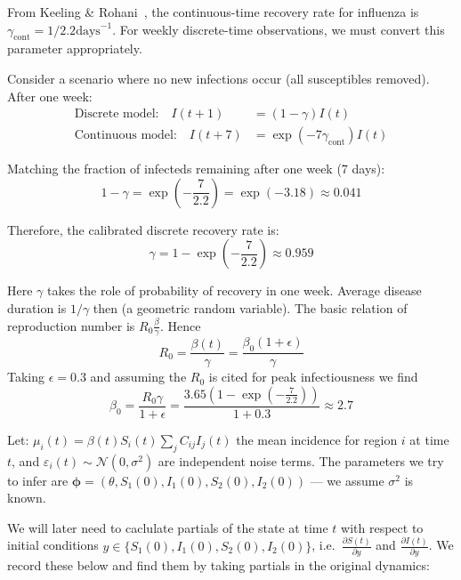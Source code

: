 From Keeling \& Rohani~\cite{keeling2008modeling}, the continuous-time
recovery rate for influenza is $\gamma_{\text{cont}} = 1/2.2 \text{
  days}^{-1}$. For weekly discrete-time observations, we must convert
this parameter appropriately.

Consider a scenario where no new infections occur (all susceptibles
removed). After one week:
\begin{align}
\text{Discrete model:} \quad I(t+1) &= (1-\gamma) I(t) \\
\text{Continuous model:} \quad I(t+7) &= \exp(-7\gamma_{\text{cont}}) I(t)
\end{align}

Matching the fraction of infecteds remaining after one week (7 days):
\begin{equation}
1 - \gamma = \exp\left(-\frac{7}{2.2}\right) = \exp(-3.18) \approx 0.041
\end{equation}

Therefore, the calibrated discrete recovery rate is:
\begin{equation}
\gamma = 1 - \exp\left(-\frac{7}{2.2}\right) \approx 0.959
\end{equation}


Here $\gamma$ takes the role of probability of recovery in one
week. Average disease duration is $1/ \gamma$ then (a geometric random
variable). The basic relation of reproduction number is $R_0
\frac{\beta}{\gamma}$. Hence
\begin{equation}
  R_0 = \frac{\beta(t)}{\gamma} = \frac{\beta_0 (1+\epsilon)}{\gamma}
\end{equation}
Taking $\epsilon = 0.3$ and assuming the $R_0$ is cited for peak infectiousness we find
$$
\beta_0 = \frac{R_0 \gamma}{1+\epsilon} = \frac{3.65 (1-\exp\left (-\frac{7}{2.2} \right))}{1+0.3} \approx 2.7
$$

Let: $\mu_i(t) = \beta(t) S_i(t) \sum_j C_{ij} I_j(t)$ the mean
incidence for region $i$ at time $t$, and $\varepsilon_i(t) \sim
\mathcal{N}(0, \sigma^2)$ are independent noise terms. The parameters
we try to infer are $\mathbf{\phi} = (\theta, S_1(0), I_1(0), S_2(0),
I_2(0))$ --- we assume $\sigma^2$ is known.


We will later need to caclulate partials of the state at time $t$ with
respect to initial conditions $y \in \{S_1(0), I_1(0), S_2(0),
I_2(0)\}$, i.e.~$\frac{\partial S(t)}{\partial y}$ and $\frac{\partial
  I(t)}{\partial y}$. We record these below and find them by taking
partials in the original dynamics:

